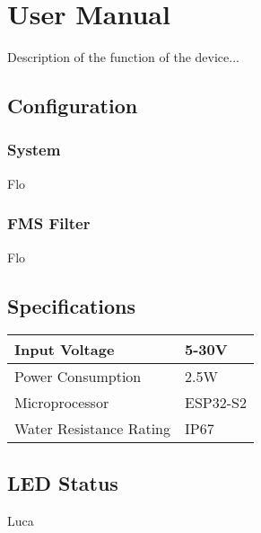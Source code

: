 \chapter{User Manual}

Description of the function of the device...

\section{Configuration}
\subsection{System}
Flo
\subsection{FMS Filter}
Flo

\section{Specifications}
\begin{center}
    \begin{tabular}{ll}
    \hline
    Input Voltage           & 5-30V         \\ \hline
    Power Consumption       & 2.5W          \\ \hline
    Microprocessor          & ESP32-S2      \\ \hline
    Water Resistance Rating & IP67          \\ \hline       
    \end{tabular}
\end{center}


\section{LED Status}
Luca

